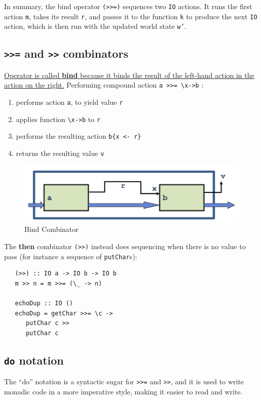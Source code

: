 In summary, the bind operator \texttt{(>>=)} sequences two \texttt{IO} actions. It runs the first action \texttt{m}, takes its result \texttt{r}, and passes it to the function \texttt{k} to produce the next \texttt{IO} action, which is then run with the updated world state \texttt{w’}.



\subsection{\texttt{>>=} and \texttt{>>} combinators}
\ul{Operator is called \textbf{bind} because it binds the result
of the left-hand action in the action on the right.}
Performing compound action \lstinline|a >>= \x->b| :
\begin{enumerate}
   \item performs action \lstinline|a|, to yield value \lstinline|r|
   \item applies function \lstinline|\x->b| to \lstinline|r|
   \item performs the resulting action \lstinline|b{x <- r}|
   \item returns the resulting value \lstinline|v|
\end{enumerate}

\begin{figure}[htbp]
   \centering
   \includegraphics{images/bind_combinator.png}
   \caption{Bind Combinator}
   \label{fig:bind_combinator}
\end{figure}

The \textbf{then} combinator \lstinline|(>>)| instead does sequencing when there is no value to pass (for instance a sequence of \lstinline|putChar|s):
\begin{lstlisting}
   (>>) :: IO a -> IO b -> IO b
   m >> n = m >>= (\_ -> n)

   echoDup :: IO ()
   echoDup = getChar >>= \c ->
      putChar c >>
      putChar c
\end{lstlisting}

\subsection{\texttt{do} notation}
The ``do'' notation is a syntactic sugar for \lstinline|>>=| and \lstinline|>>|, and it is used to write monadic code in a more imperative style, making it easier to read and write.

